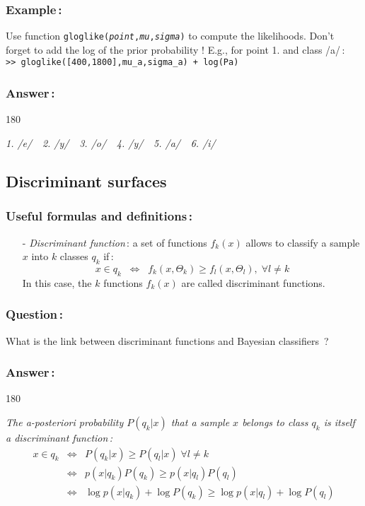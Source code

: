 \documentclass[twoside,a4paper,titlepage]{article}
\newcommand{\com}[1]{{\tt #1}}
\newcommand{\expl}[1]{%
\begin{turn}{180}%
\parbox{\textwidth}{\em #1}%
\end{turn}%
}
\begin{document}
\subsubsection*{Example\,:}
Use function \com{gloglike({\em point},{\em mu},{\em sigma})} to compute
the likelihoods. Don't forget to add the log of the prior probability !
E.g., for point 1. and class /a/\,: \\
\com{>> gloglike([400,1800],mu\_a,sigma\_a) + log(Pa)}

\subsubsection*{Answer\,:}
\expl{1. /e/ \,\, 2. /y/ \,\, 3. /o/ \,\, 4. /y/ \,\, 5. /a/ \,\, 6. /i/}


\bigskip
\subsection{Discriminant surfaces}
\label{discr}

\subsubsection*{Useful formulas and definitions\,:}
\begin{itemize}
\item[-] {\em Discriminant function}\,: a set of functions $f_k(x)$ allows
to classify a sample $x$ into $k$ classes $q_k$ if\,:
\[
x \in q_k \;\; \Leftrightarrow \;\; f_k(x,\Theta_k) \geq f_l(x,\Theta_l),
\; \forall l \neq k
\]
In this case, the $k$ functions $f_k(x)$ are called discriminant functions.
\end{itemize}

\subsubsection*{Question\,:}
What is the link between discriminant functions and Bayesian classifiers~?

\subsubsection*{Answer\,:}
\expl{The a-posteriori probability $P(q_k|x)$ that a sample $x$ belongs to
class $q_k$ is itself a discriminant function\,:
\begin{eqnarray}
x \in q_k & \Leftrightarrow & P(q_k|x) \geq P(q_l|x) \; \forall l \neq k \nonumber \\
 & \Leftrightarrow & p(x|q_k) P(q_k) \geq p(x|q_l) P(q_l) \nonumber \\
 & \Leftrightarrow & \log p(x|q_k) + \log P(q_k) \geq \log p(x|q_l) + \log P(q_l) \nonumber
\end{eqnarray}
}
\end{document}
